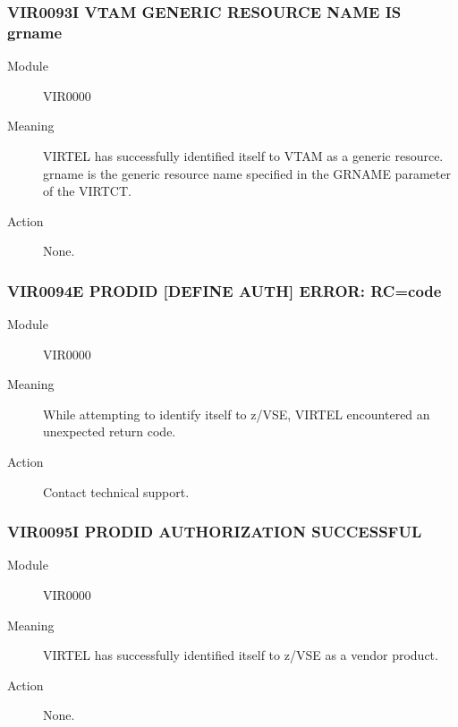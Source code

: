 \documentclass[letterpaper,10pt,english]{sphinxmanual}
\begin{document}
\subsubsection{VIR0093I VTAM GENERIC RESOURCE NAME IS grname}
\label{\detokenize{messages:vir0093i-vtam-generic-resource-name-is-grname}}\begin{description}
\item[{Module}] \leavevmode
VIR0000

\item[{Meaning}] \leavevmode
VIRTEL has successfully identified itself to VTAM as a generic resource. grname is the generic resource name specified in the GRNAME parameter of the VIRTCT.

\item[{Action}] \leavevmode
None.

\end{description}


\subsubsection{VIR0094E PRODID {[}DEFINE \textbar{} AUTH{]} ERROR: RC=code}
\label{\detokenize{messages:vir0094e-prodid-define-auth-error-rc-code}}\begin{description}
\item[{Module}] \leavevmode
VIR0000

\item[{Meaning}] \leavevmode
While attempting to identify itself to z/VSE, VIRTEL encountered an unexpected return code.

\item[{Action}] \leavevmode
Contact technical support.

\end{description}


\subsubsection{VIR0095I PRODID AUTHORIZATION SUCCESSFUL}
\label{\detokenize{messages:vir0095i-prodid-authorization-successful}}\begin{description}
\item[{Module}] \leavevmode
VIR0000

\item[{Meaning}] \leavevmode
VIRTEL has successfully identified itself to z/VSE as a vendor product.

\item[{Action}] \leavevmode
None.

\end{description}
\end{document}
